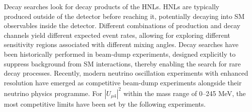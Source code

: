 Decay searches look for decay products of the HNLs.
HNLs are typically produced outside of the detector before reaching it, potentially decaying into SM observables inside the detector.
Different combinations of production and decay channels yield different expected event rates, allowing for exploring different sensitivity regions associated with different mixing angles.
Decay searches have been historically performed in beam-dump experiments, designed explicitly to suppress background from SM interactions, thereby enabling the search for rare decay processes.
Recently, modern neutrino oscillation experiments with enhanced resolution have emerged as competitive beam-dump experiments alongside their neutrino physics programme.
For $|U_{\mu4}|^{2}$ within the mass range of 0--245 MeV, the most competitive limits have been set by the following experiments.

